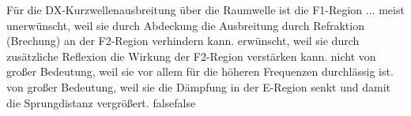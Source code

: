     {Für die DX-Kurzwellenausbreitung über die Raumwelle ist die F1-Region ...}
    {meist unerwünscht, weil sie durch Abdeckung die Ausbreitung durch Refraktion (Brechung) an der F2-Region verhindern kann.}
    {erwünscht, weil sie durch zusätzliche Reflexion die Wirkung der F2-Region verstärken kann.}
    {nicht von großer Bedeutung, weil sie vor allem für die höheren Frequenzen durchlässig ist.}
    {von großer Bedeutung, weil sie die Dämpfung in der E-Region senkt und damit die Sprungdistanz vergrößert.}
    {false}{false}